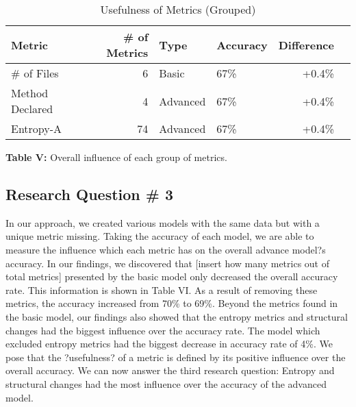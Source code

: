 \documentclass[10pt, conference]{IEEEtran}
\begin{document}
\begin{table}[h!]
  \centering
  \caption{ Usefulness of Metrics (Grouped)}
  \label{tab:Figure VII}
  \begin{tabular}{l|rllrr}
    \toprule
    \textbf {Metric} & \textbf{\# of Metrics} & \textbf{Type} & \textbf{Accuracy} & \textbf{Difference}\\%
    \midrule
    \# of Files & 6 & Basic & 67\% & +0.4\%\\ %
    Method Declared & 4 & Advanced & 67\% & +0.4\%\\ %
   Entropy-A & 74 & Advanced & 67\% & +0.4\%\\%
    \bottomrule
  \end{tabular}
  \break
  \break
\textbf{Table V:} Overall influence of each group of metrics. 
\end{table}

\subsection{Research Question \# 3}
In our approach, we created various models with the same data but with a unique metric missing. Taking the accuracy of each model, we are able to measure the influence which each metric has on the overall advance model?s accuracy. In our findings, we discovered that [insert how many metrics out of total metrics] presented by the basic model only decreased the overall accuracy rate. This information is shown in Table VI. As a result of removing these metrics, the accuracy increased from 70\% to 69\%. Beyond the metrics found in the basic model, our findings also showed that the entropy metrics and structural changes had the biggest influence over the accuracy rate. The model which excluded entropy metrics had the biggest decrease in accuracy rate of 4\%. We pose that the ?usefulness? of a metric is defined by its positive influence over the overall accuracy. We can now answer the third research question: Entropy and structural changes had the most influence over the accuracy of the advanced model.
\end{document}
